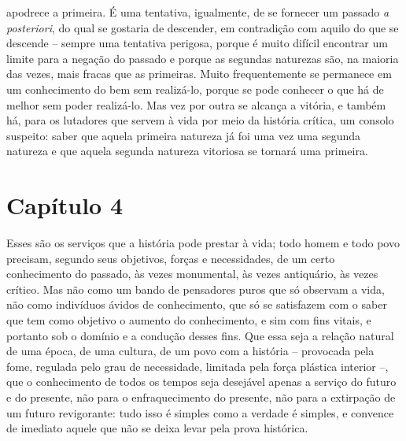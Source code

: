 apodrece a primeira. É uma tentativa, igualmente, de se fornecer um
passado \emph{a posteriori}, do qual se gostaria de descender, em
contradição com aquilo do que se descende -- sempre uma tentativa
perigosa, porque é muito difícil encontrar um limite para a negação do
passado e porque as segundas naturezas são, na maioria das vezes, mais
fracas que as primeiras. Muito frequentemente se permanece em um
conhecimento do bem sem realizá-lo, porque se pode conhecer o que há de
melhor sem poder realizá-lo. Mas vez por outra se alcança a vitória, e
também há, para os lutadores que servem à vida por meio da história
crítica, um consolo suspeito: saber que aquela primeira natureza já foi
uma vez uma segunda natureza e que aquela segunda natureza vitoriosa se
tornará uma primeira.

  \chapter{Capítulo 4}\label{capuxedtulo-4}

    Esses são os serviços que a história pode prestar à vida; todo homem
    e todo povo precisam, segundo seus objetivos, forças e necessidades,
    de um certo conhecimento do passado, às vezes monumental, às vezes
    antiquário, às vezes crítico. Mas não como um bando de pensadores
    puros que só observam a vida, não como indivíduos ávidos de
    conhecimento, que só se satisfazem com o saber que tem como objetivo
    o aumento do conhecimento, e sim com fins vitais, e portanto sob o
    domínio e a condução desses fins. Que essa seja a relação natural de
    uma época, de uma cultura, de um povo com a história -- provocada
    pela fome, regulada pelo grau de necessidade, limitada pela força
    plástica interior --, que o conhecimento de todos os tempos seja
    desejável apenas a serviço do futuro e do presente, não para o
    enfraquecimento do presente, não para a extirpação de um futuro
    revigorante: tudo isso é simples como a verdade é simples, e
    convence de imediato aquele que não se deixa levar pela prova
    histórica.

